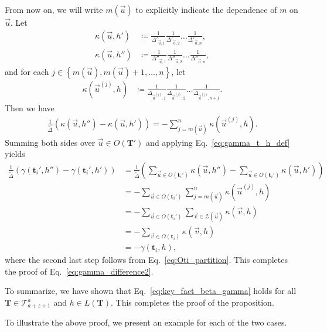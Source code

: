 \documentclass[superscriptaddress,onecolumn,nofootinbib,longbibliography,a4paper,accepted=2026-09-29]{quantumarticle}
\theoremstyle{plain}
\theoremstyle{definition}
\numberwithin{thm}{section}
\numberwithin{assumption}{section}
\numberwithin{lemma}{section}
\numberwithin{prop}{section}
\numberwithin{cor}{section}
\numberwithin{definition}{section}
\numberwithin{rmk}{section}
\numberwithin{equation}{section}
\newcommand{\lrb}[1]{\left ( #1 \right )}
\newcommand{\lrcb}[1]{\left \{ #1 \right \}}
\newcommand{\defeq}{\coloneqq}
\newcommand{\mbt}{\mathbf{t}}
\newcommand{\mbf}{\mathbf{T}}
\begin{document}
\begin{itemize}
From now on, we will write $m(\vec u)$ to explicitly indicate the dependence of $m$ on $\vec u$. Let 
\begin{align}
\kappa(\vec u, h') &\defeq \frac{1}{\Delta'_{\vec u, 1}}
\frac{1}{\Delta'_{\vec u, 2}} \dots
\frac{1}{\Delta'_{\vec u, n}}, \\
\kappa(\vec u, h'') &\defeq \frac{1}{\Delta''_{\vec u, 1}}
\frac{1}{\Delta''_{\vec u, 2}} \dots
\frac{1}{\Delta''_{\vec u, n}},   
\end{align}
and for each $j \in \lrcb{m(\vec u), m(\vec u)+1, \dots, n}$, let 
\begin{align}
\kappa(\vec u^{(j)}, h) &\defeq \frac{1}{\Delta_{\vec u^{(j)}, 1}}
\frac{1}{\Delta_{\vec u^{(j)}, 2}} \dots
\frac{1}{\Delta_{\vec u^{(j)}, n+1}}.
\end{align}
Then we have
\begin{align}
\frac{1}{\tilde{\Delta}} \lrb{\kappa(\vec u, h'') - \kappa(\vec u, h')}
=-\sum_{j=m(\vec u)}^n \kappa(\vec u^{(j)}, h).
\end{align}
Summing both sides over $\vec u \in O(\mbf')$ and applying Eq.~\eqref{eq:gamma_t_h_def} yields
\begin{align}
\frac{1}{\tilde{\Delta}} \lrb{\gamma(\mbt_i', h'')-\gamma(\mbt_i', h')}
&=\frac{1}{\tilde{\Delta}} \lrb{\sum_{\vec u \in O(\mbt_i')}\kappa(\vec u, h'') - \sum_{\vec u \in O(\mbt_i')} \kappa(\vec u, h')}\\
&=-\sum_{\vec u \in O(\mbt_i')}\sum_{j=m(\vec u)}^n \kappa(\vec u^{(j)}, h) \\
&=-\sum_{\vec u \in O(\mbt_i')}\sum_{\vec v \in \mathcal{Z}(\vec u)}  \kappa(\vec v, h) \\
&=-\sum_{\vec v \in O(\mbt_i)}  \kappa(\vec v, h) \\
&=-\gamma(\mbt_i, h),
\end{align}
where the second last step follows from Eq.~\eqref{eq:Oti_partition}. This completes the proof of Eq.~\eqref{eq:gamma_difference2}.
\end{itemize}
To summarize, we have shown that Eq.~\eqref{eq:key_fact_beta_gamma}  holds for all $\mbf \in \mathcal{T}^{a}_{a+z+1}$ and $h \in L(\mbf)$. This completes the proof of the proposition.

To illustrate the above proof, we present an example for each of the two cases.
\end{document}
